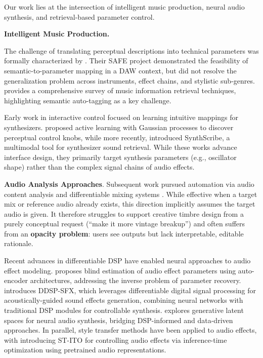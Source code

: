 Our work lies at the intersection of intelligent music production, neural audio synthesis, and retrieval-based parameter control.

\noindent\textbf{Intelligent Music Production.}

The challenge of translating perceptual descriptions into technical parameters was formally characterized by \citet{stables2014semantic}. Their SAFE project demonstrated the feasibility of semantic-to-parameter mapping in a DAW context, but did not resolve the generalization problem across instruments, effect chains, and stylistic sub-genres. \citet{schedl2014survey} provides a comprehensive survey of music information retrieval techniques, highlighting semantic auto-tagging as a key challenge.

Early work in interactive control focused on learning intuitive mappings for synthesizers. \citet{kuli2014active} proposed active learning with Gaussian processes to discover perceptual control knobs, while more recently, \citet{bryan2024synthscribe} introduced SynthScribe, a multimodal tool for synthesizer sound retrieval. While these works advance interface design, they primarily target synthesis parameters (e.g., oscillator shape) rather than the complex signal chains of audio effects.

\textbf{Audio Analysis Approaches}. Subsequent work pursued automation via audio content analysis and differentiable mixing systems \citep{martinez2020deep,steinmetz2022automix,moliner2025megami}. While effective when a target mix or reference audio already exists, this direction implicitly assumes the target audio is given. It therefore struggles to support creative timbre design from a purely conceptual request (``make it more vintage breakup'') and often suffers from an \textbf{opacity problem}: users see outputs but lack interpretable, editable rationale.

Recent advances in differentiable DSP have enabled neural approaches to audio effect modeling. \citet{peladeau2024blind} proposes blind estimation of audio effect parameters using auto-encoder architectures, addressing the inverse problem of parameter recovery. \citet{liu2024ddspSFX} introduces DDSP-SFX, which leverages differentiable digital signal processing for acoustically-guided sound effects generation, combining neural networks with traditional DSP modules for controllable synthesis. \citet{deemanat2025latent} explores generative latent spaces for neural audio synthesis, bridging DSP-informed and data-driven approaches. In parallel, style transfer methods have been applied to audio effects, with \citet{benetos2024stito} introducing ST-ITO for controlling audio effects via inference-time optimization using pretrained audio representations.

